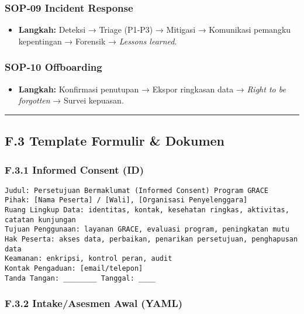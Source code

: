 \documentclass[
  letterpaper,
  DIV=11,
  numbers=noendperiod]{scrartcl}
\providecommand{\tightlist}{%
  \setlength{\itemsep}{0pt}\setlength{\parskip}{0pt}}
\begin{document}
\subsubsection{SOP‑09 Incident Response}\label{sop09-incident-response}

\begin{itemize}
\tightlist
\item
  \textbf{Langkah:} Deteksi → Triage (P1‑P3) → Mitigasi → Komunikasi
  pemangku kepentingan → Forensik → \emph{Lessons learned}.
\end{itemize}

\subsubsection{SOP‑10 Offboarding}\label{sop10-offboarding}

\begin{itemize}
\tightlist
\item
  \textbf{Langkah:} Konfirmasi penutupan → Ekspor ringkasan data →
  \emph{Right to be forgotten} → Survei kepuasan.
\end{itemize}

\begin{center}\rule{0.5\linewidth}{0.5pt}\end{center}

\subsection{F.3 Template Formulir \&
Dokumen}\label{f.3-template-formulir-dokumen}

\subsubsection{F.3.1 Informed Consent
(ID)}\label{f.3.1-informed-consent-id}

\begin{verbatim}
Judul: Persetujuan Bermaklumat (Informed Consent) Program GRACE
Pihak: [Nama Peserta] / [Wali], [Organisasi Penyelenggara]
Ruang Lingkup Data: identitas, kontak, kesehatan ringkas, aktivitas, catatan kunjungan
Tujuan Penggunaan: layanan GRACE, evaluasi program, peningkatan mutu
Hak Peserta: akses data, perbaikan, penarikan persetujuan, penghapusan data
Keamanan: enkripsi, kontrol peran, audit
Kontak Pengaduan: [email/telepon]
Tanda Tangan: ________ Tanggal: ____
\end{verbatim}

\subsubsection{F.3.2 Intake/Asesmen Awal
(YAML)}\label{f.3.2-intakeasesmen-awal-yaml}
\end{document}
